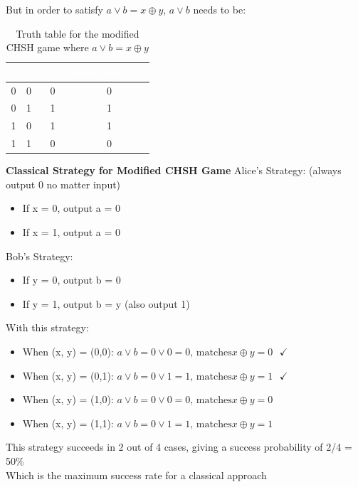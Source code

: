 \documentclass[12pt]{article}
\begin{document}
But in order to satisfy $a \vee b = x \oplus y$, $a \vee b$ needs to be:
\begin{table}[htbp]
    \centering
    \begin{tabular}{|c|c|c|c|}
        \hline
        \rowcolor[HTML]{333333} 
        \textcolor{white}{$x$} & \textcolor{white}{$y$} & \textcolor{white}{$x \oplus y$} & \textcolor{white}{Required $a \vee b$} \\
        \hline
        0 & 0 & 0 & 0 \\
        \hline
        0 & 1 & 1 & 1 \\
        \hline
        1 & 0 & 1 & 1 \\
        \hline
        1 & 1 & 0 & 0 \\
        \hline
    \end{tabular}
    \caption{Truth table for the modified CHSH game where $a \vee b = x \oplus y$}
    \label{tab:modified-chsh}
\end{table}

\textbf{Classical Strategy for Modified CHSH Game}
Alice's Strategy: (always output 0 no matter input)
\begin{itemize}
    \item If x = 0, output a = 0
    \item If x = 1, output a = 0
\end{itemize}
Bob's Strategy:
\begin{itemize}
    \item If y = 0, output b = 0
    \item If y = 1, output b = y (also output 1)
\end{itemize}
With this strategy:
\begin{itemize}
    \item When (x, y) = (0,0): $a \vee b = 0 \vee 0 = 0 \text{, matches} x \oplus y = 0 \text{ } \checkmark $
    \item When (x, y) = (0,1): $a \vee b = 0 \vee 1 = 1 \text{, matches} x \oplus y = 1 \text{ } \checkmark $
    \item When (x, y) = (1,0): $a \vee b = 0 \vee 0 = 0 \text{, matches} x \oplus y = 0 \text{ } $ 
    \item When (x, y) = (1,1): $a \vee b = 0 \vee 1 = 1 \text{, matches} x \oplus y = 1 \text{ } $ 
\end{itemize}
This strategy succeeds in 2 out of 4 cases, giving a success probability of 2/4 = 50\%
\\
Which is the maximum success rate for a classical approach
\end{document}
